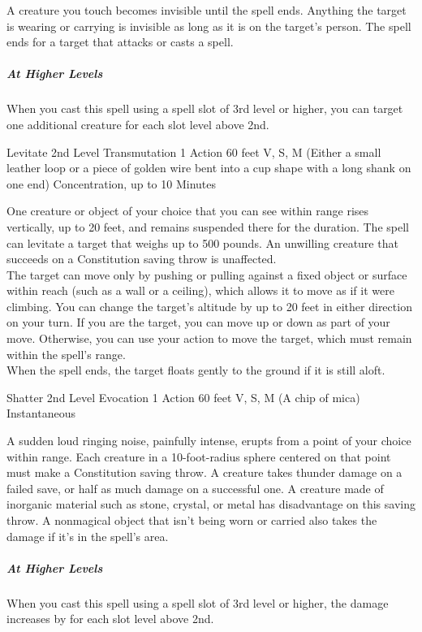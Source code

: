 \documentclass[letterpaper,openany,oneside,twocolumn]{book}
\begin{document}
A creature you touch becomes invisible until the spell ends. Anything the target is wearing or carrying is invisible as long as it is on the target's person. The spell ends for a target that attacks or casts a spell.

\subparagraph*{At Higher Levels} When you cast this spell using a spell slot of 3rd level or higher, you can target one additional creature for each slot level above 2nd.

\DndSpellHeader
  {Levitate}
  {2nd Level Transmutation}
  {1 Action}
  {60 feet}
  {V, S, M (Either a small leather loop or a piece of golden wire bent into a cup shape with a long shank on one end)}
  {Concentration, up to 10 Minutes}
  
One creature or object of your choice that you can see within range rises vertically, up to 20 feet, and remains suspended there for the duration. The spell can levitate a target that weighs up to 500 pounds. An unwilling creature that succeeds on a Constitution saving throw is unaffected.\\
The target can move only by pushing or pulling against a fixed object or surface within reach (such as a wall or a ceiling), which allows it to move as if it were climbing. You can change the target's altitude by up to 20 feet in either direction on your turn. If you are the target, you can move up or down as part of your move. Otherwise, you can use your action to move the target, which must remain within the spell's range.\\
When the spell ends, the target floats gently to the ground if it is still aloft.

\DndSpellHeader
  {Shatter}
  {2nd Level Evocation}
  {1 Action}
  {60 feet}
  {V, S, M (A chip of mica)}
  {Instantaneous}

A sudden loud ringing noise, painfully intense, erupts from a point of your choice within range. Each creature in a 10-foot-radius sphere centered on that point must make a Constitution saving throw. A creature takes  thunder damage on a failed save, or half as much damage on a successful one. A creature made of inorganic material such as stone, crystal, or metal has disadvantage on this saving throw. A nonmagical object that isn't being worn or carried also takes the damage if it's in the spell's area.

\subparagraph*{At Higher Levels} When you cast this spell using a spell slot of 3rd level or higher, the damage increases by  for each slot level above 2nd.
\end{document}
